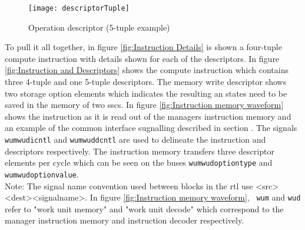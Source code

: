 \begin{figure}[!t]
\centering
\captionsetup{justification=centering}
\captionsetup{width=.9\linewidth}
\centerline{
\mbox{\texttt{[image: descriptorTuple]}}
}
\caption{Operation descriptor (5-tuple example)}
\label{fig:descriptorTuple}
\end{figure}

To pull it all together, in figure \ref{fig:Instruction Details} is shown a four-tuple compute instruction with details shown for each of the descriptors.
In figure \ref{fig:Instruction and Descriptors} shows the compute instruction which contains three 4-tuple and one 5-tuple descriptors.
The memory write descriptor shows two storage option elements which indicates the resulting \ac{an} states need to be saved in the memory of two \acp{ssc}.
In figure \ref{fig:Instruction memory waveform} shows the instruction as it is read out of the managers instruction memory and an example of the common interface sugnalling described in section \label{sec:Common Bus Signalling}.
The signals \texttt{wum\textunderscore\textunderscore wud\textunderscore\textunderscore icntl} and \texttt{wum\textunderscore\textunderscore wud\textunderscore\textunderscore dcntl} are used to delineate the instruction and descriptors respectively.
The instruction memory transfers three descriptor elements per cycle which can be seen on the buses \texttt{wum\textunderscore\textunderscore wud\textunderscore\textunderscore option\textunderscore type} and \texttt{wum\textunderscore\textunderscore wud\textunderscore\textunderscore option\textunderscore value}.
\\
Note: The signal name convention used between blocks in the \ac{rtl} use <src>\textunderscore\textunderscore <dest>\textunderscore\textunderscore <signal\textunderscore\textunderscore  name>. In figure \ref{fig:Instruction memory waveform},~ \texttt{wum} and \texttt{wud} refer to "work unit memory" and "work unit decode"
which correspond to the manager instruction memory and instruction decoder respectively.

